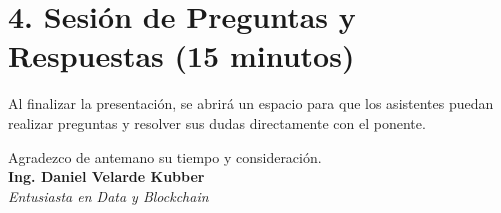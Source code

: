\documentclass[12pt,a4paper]{article}
\begin{document}
\section*{4. Sesión de Preguntas y Respuestas (15 minutos)}

Al finalizar la presentación, se abrirá un espacio para que los asistentes puedan realizar preguntas y resolver sus dudas directamente con el ponente.

\vspace{2cm}

\begin{center}
    Agradezco de antemano su tiempo y consideración. \\
    \vspace{0.5cm}
    \textbf{Ing. Daniel Velarde Kubber} \\
    \textit{Entusiasta en Data y Blockchain}
\end{center}
\end{document}
